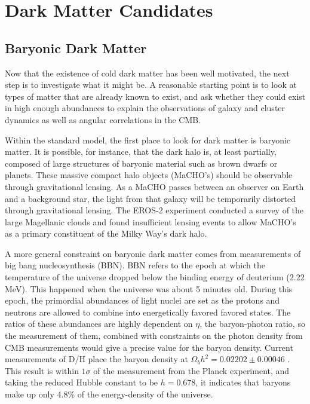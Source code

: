 \section{Dark Matter Candidates}
\subsection{Baryonic Dark Matter}
Now that the existence of cold dark matter has been well motivated, the next step is to investigate what it might be. A reasonable starting point is to look at types of matter that are already known to exist, and ask whether they could exist in high enough abundances to explain the observations of galaxy and cluster dynamics as well as angular correlations in the CMB.  

Within the standard model, the first place to look for dark matter is baryonic matter. It is possible, for instance, that the dark halo is, at least partially, composed of large structures of baryonic material such as brown dwarfs or planets. These massive compact halo objects (MaCHO's) should be observable through gravitational lensing. As a MaCHO passes between an observer on Earth and a background star, the light from that galaxy will be temporarily distorted through gravitational lensing. The EROS-2 experiment conducted a survey of the large Magellanic clouds and found insufficient lensing events to allow MaCHO's as a primary constituent of the Milky Way's dark halo\cite{macho}.

A more general constraint on baryonic dark matter comes from measurements of big bang nucleosynthesis (BBN). BBN refers to the epoch at which the temperature of the universe dropped below the binding energy of deuterium (2.22 MeV). This happened when the universe was about 5 minutes old. During this epoch, the primordial abundances of light nuclei are set as the protons and neutrons are allowed to combine into energetically favored favored states. The ratios of these abundances are highly dependent on $\eta$, the baryon-photon ratio, so the measurement of them, combined with constraints on the photon density from CMB measurements would give a precise value for the baryon density\cite{ryden}. Current measurements of D/H place the baryon density at $\Omega_{b} h^{2} = 0.02202 \pm 0.00046$ \cite{bbn}. This result is within $1\sigma$ of the measurement from the Planck experiment, and taking the reduced Hubble constant to be $h = 0.678$, it indicates that baryons make up only 4.8\% of the energy-density of the universe\cite{planck2015}.


